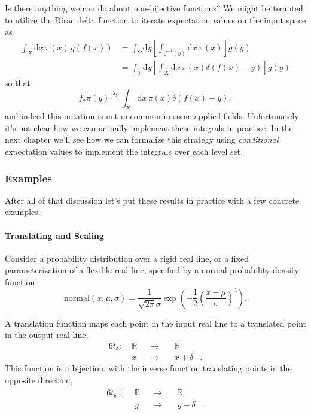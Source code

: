 \documentclass[
  letterpaper,
  DIV=11,
  numbers=noendperiod]{scrartcl}
\let\oldparagraph\paragraph
\renewcommand{\paragraph}[1]{\oldparagraph{#1}\mbox{}}
\begin{document}
Is there anything we can do about non-bijective functions? We might be
tempted to utilize the Dirac delta function to iterate expectation
values on the input space as \begin{align*}
\int_{X} \mathrm{d} x \, \pi(x) \, g(f(x))
&=
\int_{Y} \mathrm{d} y
\left[ \int_{f^{-1}(y)} \mathrm{d} x \, \pi(x) \right] g(y)
\\
&=
\int_{Y} \mathrm{d} y
\left[ \int_{X} \mathrm{d} x \, \pi(x) \delta( f(x) - y ) \right] g(y)
\end{align*} so that \[
f_{*} \pi(y) \overset{\lambda_{Y}}{=}
\int_{X} \mathrm{d} x \, \pi(x) \delta( f(x) - y ),
\] and indeed this notation is not uncommon in some applied fields.
Unfortunately it's not clear how we can actually implement these
integrals in practice. In the next chapter we'll see how we can
formalize this strategy using \emph{conditional} expectation values to
implement the integrals over each level set.

\hypertarget{examples}{%
\subsubsection{Examples}\label{examples}}

After all of that discussion let's put these results in practice with a
few concrete examples.

\hypertarget{translating-and-scaling}{%
\paragraph{Translating and Scaling}\label{translating-and-scaling}}

Consider a probability distribution over a rigid real line, or a fixed
parameterization of a flexible real line, specified by a normal
probability density function \[
\mathrm{normal}(x; \mu, \sigma)
=
\frac{1}{\sqrt{2 \pi} \sigma}
\exp \left(
-\frac{1}{2} \left( \frac{ x - \mu}{\sigma} \right)^{2}
\right).
\]

A translation function maps each point in the input real line to a
translated point in the output real line, \begin{alignat*}{6}
t_{\delta} :\; & \mathbb{R} & &\rightarrow& \; & \mathbb{R} &
\\
& x & &\mapsto& & x + \delta &.
\end{alignat*} This function is a bijection, with the inverse function
translating points in the opposite direction, \begin{alignat*}{6}
t_{\delta}^{-1} :\; & \mathbb{R} & &\rightarrow& \; & \mathbb{R} &
\\
& y & &\mapsto& & y - \delta &.
\end{alignat*}
\end{document}
